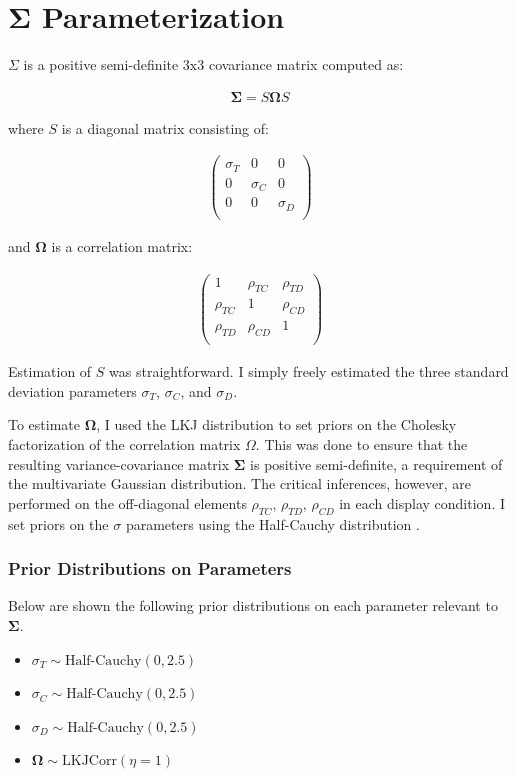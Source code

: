 \section{$\boldsymbol{\Sigma}$ Parameterization}
$\Sigma$ is a positive semi-definite $3\text{x}3$ covariance matrix computed as:

\begin{align}
   \boldsymbol{\Sigma}=S\boldsymbol{\Omega}S
   \label{eqn:Sigma}
\end{align}

where $S$ is a diagonal matrix consisting of: 

\begin{align}
   \begin{pmatrix}
      \sigma_{T} & 0 & 0 \\
      0 & \sigma_{C} & 0 \\
      0 & 0 & \sigma_{D} \\
   \end{pmatrix}
   \label{eqn:S}
\end{align}

and $\boldsymbol{\Omega}$ is a correlation matrix:

\begin{align}
   \begin{pmatrix}
      1 & \rho_{TC} & \rho_{TD} \\
      \rho_{TC} & 1 & \rho_{CD} \\
      \rho_{TD} & \rho_{CD} & 1 \\
   \end{pmatrix}
   \label{eqn:O}
\end{align}

Estimation of $S$ was straightforward. I simply freely estimated the three standard deviation parameters $\sigma_{T}$, $\sigma_{C}$, and $\sigma_{D}$.

To estimate $\boldsymbol{\Omega}$, I used the LKJ distribution \parencite{lewandowski2009generating} to set priors on the Cholesky factorization of the correlation matrix $\Omega$. This was done to ensure that the resulting variance-covariance matrix $\boldsymbol{\Sigma}$ is positive semi-definite, a requirement of the multivariate Gaussian distribution. The critical inferences, however, are performed on the off-diagonal elements $\rho_{TC}$, $\rho_{TD}$, $\rho_{CD}$ in each display condition. I set priors on the $\sigma$ parameters using the Half-Cauchy distribution \parencite{gelman2006prior}. 

\subsubsection{Prior Distributions on Parameters}
Below are shown the following prior distributions on each parameter relevant to $\boldsymbol{\Sigma}$.
\begin{itemize}
    \item $\sigma_{T} \sim\text{Half-Cauchy}(0,2.5)$
    \item $\sigma_{C} \sim\text{Half-Cauchy}(0,2.5)$
    \item $\sigma_{D} \sim\text{Half-Cauchy}(0,2.5)$
    \item $\boldsymbol{\Omega} \sim \text{LKJCorr}(\eta=1)$
\end{itemize}

